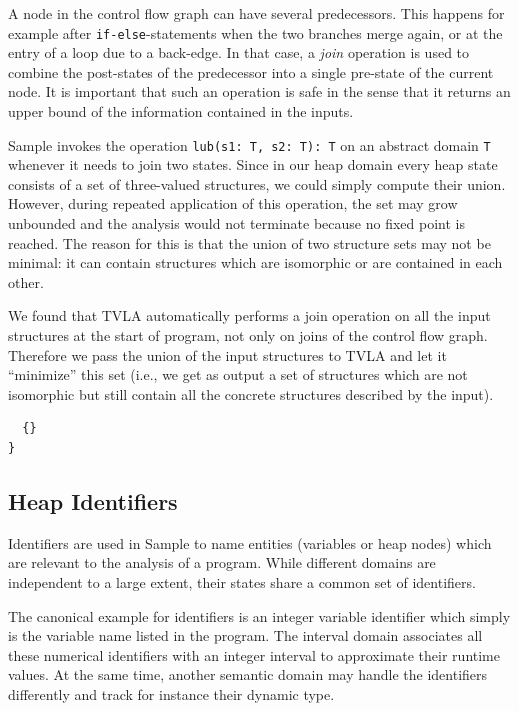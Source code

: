 \documentclass[11pt,a4paper,english]{article}
\begin{document}
A node in the control flow graph can have several predecessors. This happens for
example after \texttt{if-else}-statements when the two branches merge again, or at the
entry of a loop due to a back-edge. In that case, a \textit{join} operation is
used to combine the post-states of the predecessor into a single pre-state of
the current node. It is important that such an operation is safe in the sense
that it returns an upper bound of the information contained in the inputs. 

Sample invokes the operation \lstinline!lub(s1: T, s2: T): T!\; on an abstract
domain \texttt{T} whenever it needs to join two states. Since in our heap domain every heap
state consists of a set of three-valued structures, we could simply compute
their union. However, during repeated application of this operation, the set may
grow unbounded and the analysis would not terminate because no fixed point is
reached. The reason for this is that the union of two structure sets may not be
minimal: it can contain structures which are isomorphic or are contained in each
other.

We found that TVLA automatically performs a join operation on all the input
structures at the start of program, not only on joins of the control flow graph.
Therefore we pass the union of the input structures to TVLA and let it
``minimize'' this set (i.e., we get as output a set of structures which are not
isomorphic but still contain all the concrete structures described by the
input).
\begin{lstlisting}[language=tvp,caption={Actions for the least upper bound (lub)},label=lst:lubAction]
%action lub() {
  {}
}
\end{lstlisting}

\subsection{Heap Identifiers} 
Identifiers are used in Sample to name entities (variables or heap nodes) which
are relevant to the analysis of a program. While different domains are
independent to a large extent, their states share a common set of identifiers.

The canonical example for identifiers is an integer variable identifier which
simply is the variable name listed in the program. The interval domain
associates all these numerical identifiers with an integer interval to
approximate their runtime values. At the same time, another semantic domain may
handle the identifiers differently and track for instance their dynamic type. 
\end{document}
